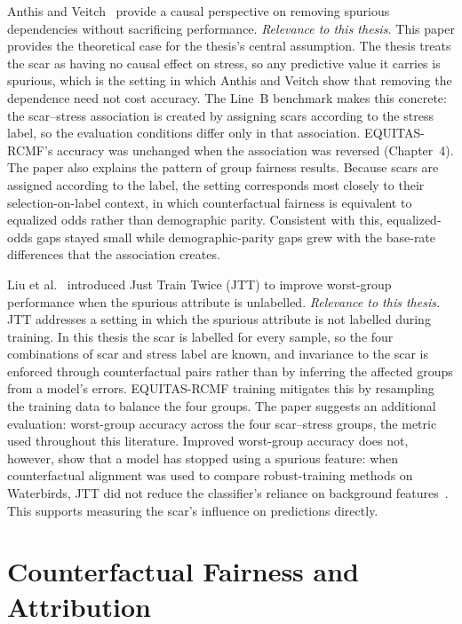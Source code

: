 Anthis and Veitch~\cite{anthis2023} provide a causal perspective on removing spurious dependencies without sacrificing performance.
\textit{Relevance to this thesis.} This paper provides the theoretical case for the thesis's central assumption. The thesis treats the scar as having no causal effect on stress, so any predictive value it carries is spurious, which is the setting in which Anthis and Veitch show that removing the dependence need not cost accuracy. The Line~B benchmark makes this concrete: the scar--stress association is created by assigning scars according to the stress label, so the evaluation conditions differ only in that association. EQUITAS-RCMF's accuracy was unchanged when the association was reversed (Chapter~4). The paper also explains the pattern of group fairness results. Because scars are assigned according to the label, the setting corresponds most closely to their selection-on-label context, in which counterfactual fairness is equivalent to equalized odds rather than demographic parity. Consistent with this, equalized-odds gaps stayed small while demographic-parity gaps grew with the base-rate differences that the association creates.

Liu et al.~\cite{liu2021} introduced Just Train Twice (JTT) to improve worst-group performance when the spurious attribute is unlabelled.
\textit{Relevance to this thesis.} JTT addresses a setting in which the spurious attribute is not labelled during training. In this thesis the scar is labelled for every sample, so the four combinations of scar and stress label are known, and invariance to the scar is enforced through counterfactual pairs rather than by inferring the affected groups from a model's errors. EQUITAS-RCMF training mitigates this by resampling the training data to balance the four groups. The paper suggests an additional evaluation: worst-group accuracy across the four scar--stress groups, the metric used throughout this literature. Improved worst-group accuracy does not, however, show that a model has stopped using a spurious feature: when counterfactual alignment was used to compare robust-training methods on Waterbirds, JTT did not reduce the classifier's reliance on background features~\cite{cohen2025}. This supports measuring the scar's influence on predictions directly.

\section{Counterfactual Fairness and Attribution}

